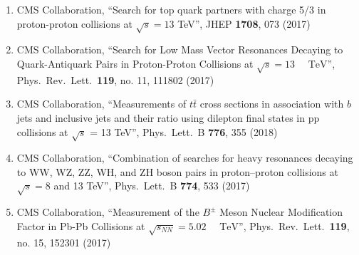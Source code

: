 \begin{enumerate}
\item CMS Collaboration, ``Search for top quark partners with charge 5/3 in proton-proton collisions at $ \sqrt{s}=13 $ TeV'', JHEP {\bf 1708}, 073 (2017)

\item CMS Collaboration, ``Search for Low Mass Vector Resonances Decaying to Quark-Antiquark Pairs in Proton-Proton Collisions at $\sqrt{s}=13\text{ }\text{ }\mathrm{TeV}$'', Phys.\ Rev.\ Lett.\  {\bf 119}, no. 11, 111802 (2017)

\item CMS Collaboration, ``Measurements of $t\bar{t}$ cross sections in association with $b$ jets and inclusive jets and their ratio using dilepton final states in pp collisions at $\sqrt{s}$ = 13 TeV'', Phys.\ Lett.\ B {\bf 776}, 355 (2018)

\item CMS Collaboration, ``Combination of searches for heavy resonances decaying to WW, WZ, ZZ, WH, and ZH boson pairs in proton–proton collisions at $\sqrt{s}=8$ and 13 TeV'', Phys.\ Lett.\ B {\bf 774}, 533 (2017)

\item CMS Collaboration, ``Measurement of the ${B}^{\pm}$ Meson Nuclear Modification Factor in Pb-Pb Collisions at $\sqrt{{s}_{NN}}=5.02\text{ }\text{ }\mathrm{TeV}$'', Phys.\ Rev.\ Lett.\  {\bf 119}, no. 15, 152301 (2017)


\end{enumerate}
